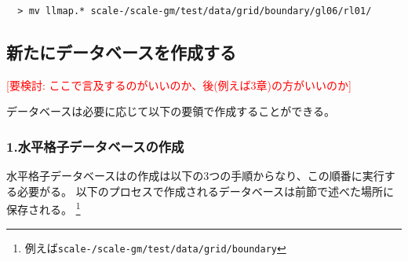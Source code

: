 \verb|  > mv llmap.* scale-|{\version}\verb|/scale-gm/test/data/grid/boundary/gl06/rl01/| \\


\subsection{新たにデータベースを作成する}
\textcolor{red}{[要検討: ここで言及するのがいいのか、後(例えば3章)の方がいいのか]}

データベースは必要に応じて以下の要領で作成することができる。
\subsubsection{1.水平格子データベースの作成}
水平格子データベースはの作成は以下の3つの手順からなり、この順番に実行する必要がる。
以下のプロセスで作成されるデータベースは前節で述べた場所に保存される。
\footnote{例えば\texttt{scale-{\version}/scale-gm/test/data/grid/boundary}}
\renewcommand{\labelenumi}{(\roman{enumi})}
